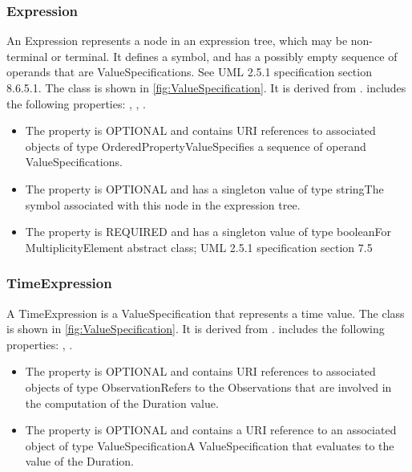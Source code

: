 \subsubsection{Expression}%
\label{sec:uml:Expression}%
An Expression represents a node in an expression tree, which may be non-terminal or terminal. It defines a symbol, and has a possibly empty sequence of operands that are ValueSpecifications. See UML 2.5.1 specification section 8.6.5.1.%
\linebreak%
\linebreak%
The  class is shown in \ref{fig:ValueSpecification}. It is derived from .%
 includes the following properties: , , . %
\begin{itemize}%
\item%
The  property is OPTIONAL and contains URI references to associated objects of type OrderedPropertyValueSpecifies a sequence of operand ValueSpecifications.%
\item%
The  property is OPTIONAL and has a singleton value of type stringThe symbol associated with this node in the expression tree.%
\item%
The  property is REQUIRED and has a singleton value of type booleanFor MultiplicityElement abstract class; UML 2.5.1 specification section 7.5%
\end{itemize}%
\subsubsection{TimeExpression}%
\label{sec:uml:TimeExpression}%
A TimeExpression is a ValueSpecification that represents a time value.%
\linebreak%
\linebreak%
The  class is shown in \ref{fig:ValueSpecification}. It is derived from .%
 includes the following properties: , . %
\begin{itemize}%
\item%
The  property is OPTIONAL and contains URI references to associated objects of type ObservationRefers to the Observations that are involved in the computation of the Duration value.%
\item%
The  property is OPTIONAL and contains a URI reference to an associated object of type ValueSpecificationA ValueSpecification that evaluates to the value of the Duration.%
\end{itemize}%

